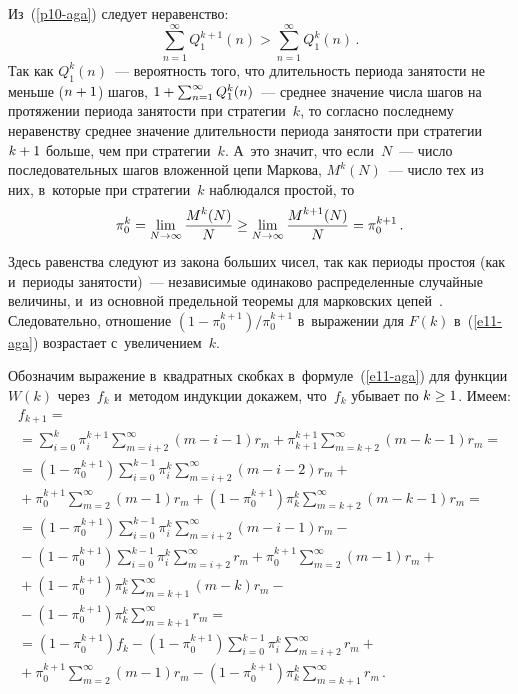 \begin{multicols}{2}
{  Из~(\ref{p10-aga}) следует неравенство:
  $$
  \sum\limits^\infty_{n=1} Q_1^{k+1}(n) > \sum\limits^\infty_{n=1} Q_1^k(n)\,.
  $$
Так как $Q_1^k(n)$~--- вероятность того, что длительность периода занятости  
не меньше ($n\hm+1$) шагов, $1\hm+ \sum\nolimits^\infty_{n=1} Q_1^k(n)$~--- 
среднее значение числа шагов на протяжении периода занятости при 
стратегии~$k$, то согласно последнему неравенству  среднее значение 
длительности периода занятости при стратегии $k\hm+1$ больше, чем при 
стратегии~$k$. А~это значит, что если~$N$~--- число последовательных шагов 
вложенной цепи Маркова, $M^k(N)$~--- число тех из них, в~которые при 
стратегии~$k$  наблюдался простой, то 
$$
\pi_0^k=\lim\limits_{N\to\infty} \displaystyle\frac{\displaystyle M^k(N)\mathstrut}{\displaystyle N\mathstrut} \geq \lim\limits_{N\to\infty} 
\displaystyle\frac{\displaystyle M^{k+1}(N)\mathstrut}{\displaystyle N\mathstrut} =\pi_0^{k+1}\,.
$$
Здесь равенства следуют из закона больших чисел, так как периоды простоя 
(как и~периоды занятости)~--- независимые одинаково распределенные 
случайные величины, и~из основной предельной теоремы для марковских 
цепей~\cite{10-aga}.  Следовательно, отношение $(1-\pi_0^{k+1})/\pi_0^{k+1}$ 
в~выражении для $F(k)$ в~(\ref{e11-aga}) возрастает с~увеличением~$k$. 

Обозначим выражение в~квадратных скобках в~формуле~(\ref{e11-aga}) для 
функции $W(k)$ через~$f_k$ и~методом индукции докажем, что~$f_k$ убывает 
по $k\hm\geq 1$. Имеем:
\begin{multline*}
f_{k+1} = {}\\
{}=\sum\limits^k_{i=0} \pi_i^{k+1} \!\!\!\sum\limits^\infty_{m=i+2} (m-i-1) r_m 
+\pi_{k+1}^{k+1} \!\!\!\sum\limits^\infty_{m=k+2} \!(m-k-1)r_m={}\\
{}=
\left(1-\pi_0^{k+1}\right) \sum\limits_{i=0}^{k-1} 
\pi_i^k \!\sum\limits^\infty_{m=i+2} (m-i-2)r_m 
+{}\\
{}+\pi_0^{k+1} \!\sum\limits^\infty_{m=2}\! (m-1)r_m+
\left( 1-\pi_0^{k+1}\right) \pi_k^k \!\!\sum\limits^\infty_{m=k+2} \!(m-k-1)r_m ={}\\
{}= \left( 1- \pi_0^{k+1}\right) 
\sum\limits^{k-1}_{i=0} \pi_i^k \sum\limits^\infty_{m=i+2} (m-i-1)r_m-{}\\
{}-
\left( 1-\pi_0^{k+1}\right) \sum\limits_{i=0}^{k-1} \pi_i^k \sum\limits^\infty_{m=i+2} r_m +\pi_0^{k+1} 
\sum\limits^\infty_{m=2} (m-1)r_m+{}\\
{}+ \left( 1-\pi_0^{k+1}\right) \pi_k^k \sum\limits^\infty_{m=k+1} (m-k)r_m-{}\\
{}-
\left( 1-\pi_0^{k+1}\right) \pi_k^k \sum\limits^\infty_{m=k+1}\!\! r_m ={}\\
{}=\left( 1- \pi_0^{k+1}\right) f_k -
\left( 1-\pi_0^{k+1}\right) \sum\limits_{i=0}^{k-1} \pi_i^k \sum\limits^\infty_{m=i+2} r_m+{}\\
{}+
\pi_0^{k+1} \sum\limits^\infty_{m=2} (m-1)r_m -\left( 1-\pi_0^{k+1}\right) \pi_k^k 
\sum\limits^\infty_{m=k+1} \!\!r_m\,.
\end{multline*}

}
\end{multicols}
